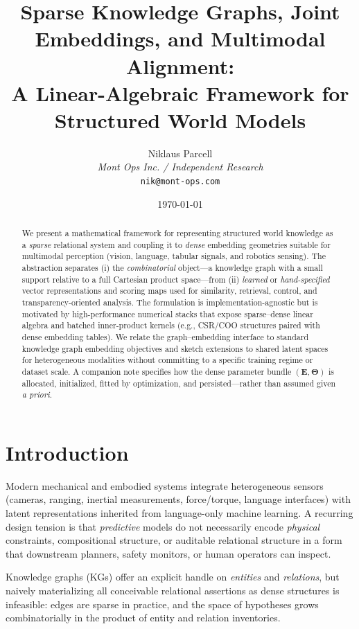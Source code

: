 \documentclass[11pt]{article}
\title{Sparse Knowledge Graphs, Joint Embeddings, and Multimodal Alignment:\\
A Linear-Algebraic Framework for Structured World Models}
\author{Niklaus Parcell\\
\textit{Mont Ops Inc. / Independent Research}\\
\texttt{nik@mont-ops.com}}
\date{\today}
\begin{document}
\maketitle

\begin{abstract}
We present a mathematical framework for representing structured world knowledge as a \emph{sparse} relational system and coupling it to \emph{dense} embedding geometries suitable for multimodal perception (vision, language, tabular signals, and robotics sensing).
The abstraction separates (i) the \emph{combinatorial} object---a knowledge graph with a small support relative to a full Cartesian product space---from (ii) \emph{learned} or \emph{hand-specified} vector representations and scoring maps used for similarity, retrieval, control, and transparency-oriented analysis.
The formulation is implementation-agnostic but is motivated by high-performance numerical stacks that expose sparse--dense linear algebra and batched inner-product kernels (e.g., CSR/COO structures paired with dense embedding tables).
We relate the graph--embedding interface to standard knowledge graph embedding objectives and sketch extensions to shared latent spaces for heterogeneous modalities without committing to a specific training regime or dataset scale.
A companion note \cite{ConstructionCompanion} specifies how the dense parameter bundle $(\bm{E}, \bm{\Theta})$ is allocated, initialized, fitted by optimization, and persisted---rather than assumed given \emph{a priori}.
\end{abstract}

\section{Introduction}
Modern mechanical and embodied systems integrate heterogeneous sensors (cameras, ranging, inertial measurements, force/torque, language interfaces) with latent representations inherited from language-only machine learning.
A recurring design tension is that \emph{predictive} models do not necessarily encode \emph{physical} constraints, compositional structure, or auditable relational structure in a form that downstream planners, safety monitors, or human operators can inspect.

Knowledge graphs (KGs) offer an explicit handle on \emph{entities} and \emph{relations}, but naively materializing all conceivable relational assertions as dense structures is infeasible: edges are sparse in practice, and the space of hypotheses grows combinatorially in the product of entity and relation inventories.
\end{document}
